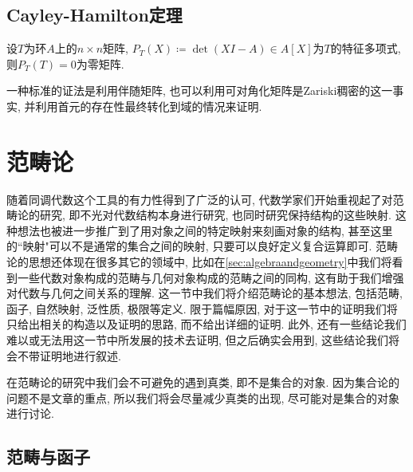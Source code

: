 \subsection{Cayley-Hamilton定理}

\begin{theorem}\label{thm:CayleyHamilton}
  设$T$为环$A$上的$n\times n$矩阵, $P_T(X)\coloneq \det (XI-A)\in A[X]$为$T$的特征多项式, 则$P_T(T)=0$为零矩阵.
\end{theorem}

一种标准的证法是利用伴随矩阵\parencite[369, Exercise 6.9]{aluffi_algebra_2009}, 也可以利用可对角化矩阵是Zariski稠密的这一事实, 并利用首元的存在性最终转化到域的情况来证明.

\section{范畴论}\label{sec:algebra-category}

随着同调代数这个工具的有力性得到了广泛的认可, 代数学家们开始重视起了对范畴论的研究, 即不光对代数结构本身进行研究, 也同时研究保持结构的这些映射. 这种想法也被进一步推广到了用对象之间的特定映射来刻画对象的结构, 甚至这里的``映射"可以不是通常的集合之间的映射, 只要可以良好定义复合运算即可. 范畴论的思想还体现在很多其它的领域中, 比如在\ref{sec:algebraandgeometry}中我们将看到一些代数对象构成的范畴与几何对象构成的范畴之间的同构, 这有助于我们增强对代数与几何之间关系的理解. 这一节中我们将介绍范畴论的基本想法, 包括范畴, 函子, 自然映射, 泛性质, 极限等定义. 限于篇幅原因, 对于这一节中的证明我们将只给出相关的构造以及证明的思路, 而不给出详细的证明. 此外, 还有一些结论我们难以或无法用这一节中所发展的技术去证明, 但之后确实会用到, 这些结论我们将会不带证明地进行叙述.

在范畴论的研究中我们会不可避免的遇到真类, 即不是集合的对象. 因为集合论的问题不是文章的重点, 所以我们将会尽量减少真类的出现, 尽可能对是集合的对象进行讨论.

\subsection{范畴与函子}

